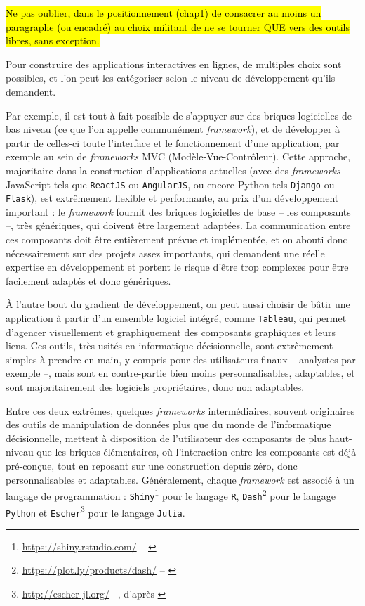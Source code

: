\hl{Ne pas oublier, dans le positionnement (chap1) de consacrer au moins un paragraphe (ou encadré) au choix \og militant\fg{} de ne se tourner QUE vers des outils libres, sans exception.}

Pour construire des applications interactives en lignes, de multiples choix sont possibles, et l'on peut les catégoriser selon le niveau de développement qu'ils demandent.

Par exemple, il est tout à fait possible de s'appuyer sur des briques logicielles de bas niveau (ce que l'on appelle communément \textit{framework}), et de développer à partir de celles-ci toute l'interface et le fonctionnement d'une application, par exemple au sein de \textit{frameworks} \og MVC\fg{} (Modèle-Vue-Contrôleur).
Cette approche, majoritaire dans la construction d'applications actuelles (avec des \textit{frameworks} JavaScript tels que \texttt{ReactJS} ou \texttt{AngularJS}, ou encore Python tels \texttt{Django} ou \texttt{Flask}), est extrêmement flexible et performante, au prix d'un développement important : le \textit{framework} fournit des \og briques\fg{} logicielles de base -- les composants --, très génériques, qui doivent être largement adaptées.
La communication entre ces composants doit être entièrement prévue et implémentée, et on abouti donc nécessairement sur des projets assez importants, qui demandent une réelle expertise en développement et portent le risque d'être trop complexes pour être facilement adaptés et donc génériques.

À l'autre bout du gradient de développement, on peut aussi choisir de bâtir une application à partir d'un ensemble logiciel intégré, comme \texttt{Tableau}, qui permet d'agencer visuellement et graphiquement des composants graphiques et leurs liens. Ces outils, très usités en informatique décisionnelle, sont extrêmement simples à prendre en main, y compris pour des \og utilisateurs finaux\fg{} -- analystes par exemple --, mais sont en contre-partie bien moins personnalisables, adaptables, et sont majoritairement des logiciels propriétaires, donc non adaptables.

Entre ces deux extrêmes, quelques \textit{frameworks} intermédiaires, souvent originaires des outils de manipulation de données plus que du monde de l'informatique décisionnelle, mettent à disposition de l'utilisateur des composants de plus haut-niveau que les \og briques élémentaires\fg{}, où l'interaction entre les composants est déjà pré-conçue, tout en reposant sur une construction \og depuis zéro\fg{}, donc personnalisables et adaptables.
Généralement, chaque \textit{framework} est associé à un langage de programmation : \texttt{Shiny}\footnote{\href{https://shiny.rstudio.com/}{https://shiny.rstudio.com/} -- \cite{chang_shiny_2015}} pour le langage \texttt{R}, \texttt{Dash}\footnote{\href{https://plot.ly/products/dash/}{https://plot.ly/products/dash/} -- \cite{plotly_introducing_2017}} pour le langage \texttt{Python} et \texttt{Escher}\footnote{\href{http://escher-jl.org/}{http://escher-jl.org/}-- \cite{gowda_escher_2018}, d'après \cite{bezanson_julia_2014}} pour le langage \texttt{Julia}.

